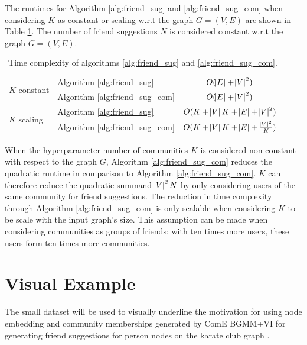 \documentclass[conference]{IEEEtran}
\begin{document}
The runtimes for Algorithm \ref{alg:friend_sug} and \ref{alg:friend_sug_com} when considering $K$ as constant or scaling w.r.t the graph $G = (V, E)$ are shown in Table \ref{tab:runtimes}. The number of friend suggestions $N$ is considered constant w.r.t the graph $G = (V, E)$.

\begin{table}
    \centering
    \caption{Time complexity of algorithms \ref{alg:friend_sug} and \ref{alg:friend_sug_com}.}
    \label{tab:runtimes}
    \begin{tabular}{l l | c}
        \multirow{2}{*}{$K$ constant} & Algorithm \ref{alg:friend_sug}     & $O(\abs{E} + \abs{V}^2)$                          \\
                                      & Algorithm \ref{alg:friend_sug_com} & $O(\abs{E} + \abs{V}^2)$                          \\
        \hline
        \multirow{2}{*}{$K$ scaling}  & Algorithm \ref{alg:friend_sug}     & $O(K + \abs{V}K + \abs{E} + \abs{V}^2)$           \\
                                      & Algorithm \ref{alg:friend_sug_com} & $O(K + \abs{V}K + \abs{E} + \frac{\abs{V}^2}{K})$ \\
    \end{tabular}
\end{table}

When the hyperparameter number of communities $K$ is considered non-constant with respect to the graph $G$, Algorithm \ref{alg:friend_sug_com} reduces the quadratic runtime in comparison to Algorithm \ref{alg:friend_sug_com}.
$K$ can therefore reduce the quadratic summand $\abs{V}^2N$ by only considering users of the same community for friend suggestions. The reduction in time complexity through Algorithm \ref{alg:friend_sug_com} is only scalable when considering $K$ to be scale with the input graph's size. This assumption can be made when considering communities as groups of friends: with ten times more users, these users form ten times more communities.


\section{Visual Example}

The small \citet{KarateClubDS} dataset will be used to visually underline the motivation for using node embedding and community memberships generated by ComE BGMM+VI for generating friend suggestions for person nodes on the karate club graph \cite{KarateClubDS}.
\end{document}
